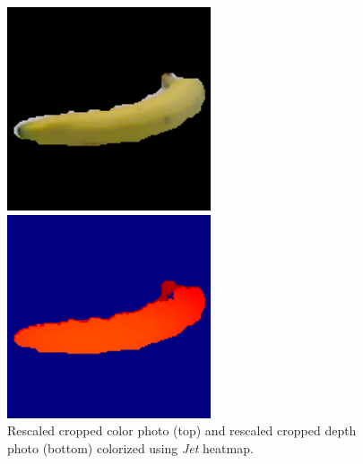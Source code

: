 \begin{figure}
    \centering
    \includegraphics[width=0.7\linewidth]{img/banana_1_1_1_resize.png}

    \vspace{0.4cm}
    \includegraphics[width=0.7\linewidth]{img/banana_1_1_1_depth_resize.png} 
    \caption{Rescaled cropped color photo (top) and rescaled cropped depth photo (bottom) colorized using \textit{Jet} heatmap.}
    \label{fig:depth_colorized}
\end{figure}